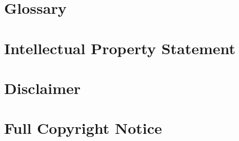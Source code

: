 \documentclass[10pt,a4paper]{article}
\begin{document}
\section{Glossary}
\label{sec:glossary}



\section{Intellectual Property Statement}


\section{Disclaimer}


\section{Full Copyright Notice}




\end{document}
